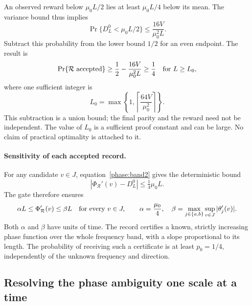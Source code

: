 \documentclass[11pt,a4paper]{article}
\numberwithin{equation}{section}
\theoremstyle{remark}
\begin{document}
An observed reward below $\mu_0L/2$ lies at least $\mu_0L/4$ below its mean.
The variance bound thus implies
\begin{equation}
 \Pr\{D_L^0<\mu_0L/2\}
 \le\frac{16V}{\mu_0^2L}.
 \label{phase:rewardtail}
\end{equation}
Subtract this probability from the lower bound $1/2$ for an even endpoint.
The result is
\begin{equation}
 \Pr\{\mathcal R\hbox{ accepted}\}
 \ge\frac12-\frac{16V}{\mu_0^2L}
 \ge\frac14
 \quad\hbox{for }L\ge L_0,
 \label{phase:acceptance}
\end{equation}
where one sufficient integer is
\begin{equation}
 L_0=\max\left\{1,
 \left\lceil\frac{64V}{\mu_0^2}\right\rceil\right\}.
 \label{phase:minimumlength}
\end{equation}
This subtraction is a union bound; the final parity and the reward need not
be independent.  The value of $L_0$ is a sufficient proof constant and can be
large.  No claim of practical optimality is attached to it.

\paragraph{Sensitivity of each accepted record.}
For any candidate $v\in J$, equation~\eqref{phase:band2} gives the
deterministic bound
\begin{equation}
 |\Phi_{\mathcal R}'(v)-D_L^0|\le\tfrac14\mu_0L.
 \label{phase:derivativecomparison}
\end{equation}
The gate therefore ensures
\begin{equation}
 \alpha L\le\Phi_{\mathcal R}'(v)\le\beta L
 \quad\hbox{for every }v\in J,
 \qquad
 \alpha=\frac{\mu_0}{4},\quad
 \beta=\max_{j\in\{a,b\}}\sup_{v\in J}|\theta_j'(v)|.
 \label{phase:derivativebound}
\end{equation}
Both $\alpha$ and $\beta$ have units of time.  The record certifies a known,
strictly increasing phase function over the whole frequency band, with a
slope proportional to its length.  The probability of receiving such a
certificate is at least $p_0=1/4$, independently of the unknown frequency
and direction.

\subsection{Resolving the phase ambiguity one scale at a time}
\label{phase:multiscale}
\end{document}
